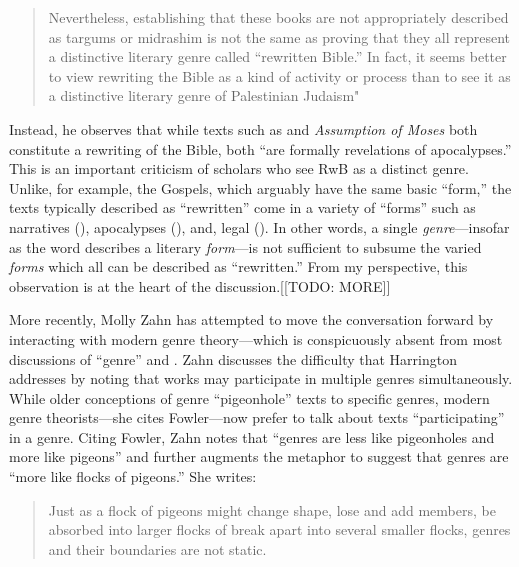 \begin{quote}
    Nevertheless, establishing that these books are not appropriately described as targums or midrashim is not the same as proving that they all represent a distinctive literary genre called ``rewritten Bible.'' In fact, it seems better to view rewriting the Bible as a kind of activity or process than to see it as a distinctive literary genre of Palestinian Judaism"\autocite[242--243]{harrington_kraft-nickelsburg1986}
\end{quote} 

Instead, he observes that while texts such as \jub and \emph{Assumption of Moses} both constitute a rewriting of the Bible, both ``are formally revelations of apocalypses.''\autocite[243]{harrington_kraft-nickelsburg1986} This is an important criticism of scholars who see RwB as a distinct genre. Unlike, for example, the Gospels, which arguably have the same basic ``form,'' the texts typically described as ``rewritten'' come in a variety of ``forms'' such as narratives (\ga), apocalypses (\jub), and, legal (\templescroll). In other words, a single \emph{genre}---insofar as the word describes a literary \emph{form}---is not sufficient to subsume the varied \emph{forms} which all can be described as ``rewritten.'' From my perspective, this observation is at the heart of the discussion.[[TODO: MORE]] 

More recently, Molly Zahn has attempted to move the conversation forward by interacting with modern genre theory---which is conspicuously absent from most discussions of ``genre'' and \rwb.\autocites{zahn_jbl2012}[Daniel Machiela noted the absence of genre theory in his 2010 article, as well, see][]{machiela_jjs2010}[Notable exceptions include][]{brooke_dsd2010} Zahn discusses the difficulty that Harrington addresses by noting that works may participate in multiple genres simultaneously. While older conceptions of genre ``pigeonhole'' texts to specific genres, modern genre theorists---she cites Fowler---now prefer to talk about texts ``participating'' in a genre. Citing Fowler, Zahn notes that ``genres are less like pigeonholes and more like pigeons'' and further augments the metaphor to suggest that genres are ``more like flocks of pigeons.'' She writes: 

\begin{quote}
    Just as a flock of pigeons might change shape, lose and add members, be absorbed into larger flocks of break apart into several smaller flocks, genres and their boundaries are not static.\autocite[277]{zahn_jbl2012}
\end{quote} 

